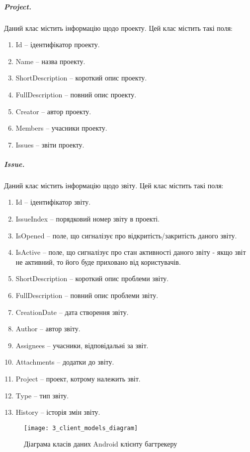 \documentclass[../main.tex]{subfiles}
\begin{document}
		\subparagraph{Project.}
			Даний клас містить інформацію щодо проекту. Цей клас містить такі поля:
			\begin{enumerate}
				\item Id -- ідентифікатор проекту.
				\item Name -- назва проекту.
				\item ShortDescription -- короткий опис проекту.
				\item FullDescription -- повний опис проекту.
				\item Creator -- автор проекту.
				\item Members -- учасники проекту.
				\item Issues -- звіти проекту.
			\end{enumerate}

		\subparagraph{Issue.}
			Даний клас містить інформацію щодо звіту. Цей клас містить такі поля:
			\begin{enumerate}
				\item Id -- ідентифікатор звіту.
				\item IssueIndex -- порядковий номер звіту в проекті.
				\item IsOpened -- поле, що сигналізує про відкритість/закритість даного звіту.
				\item IsActive -- поле, що сигналізує про стан активності даного звіту - якщо звіт не активний, то його буде приховано від користувачів.
				\item ShortDescription -- короткий опис проблеми звіту.
				\item FullDescription -- повний опис проблеми звіту.
				\item CreationDate -- дата створення звіту.
				\item Author -- автор звіту.
				\item Assignees -- учасники, відповідальні за звіт.
				\item Attachments -- додатки до звіту.
				\item Project -- проект, котрому належить звіт.
				\item Type -- тип звіту.
				\item History -- історія змін звіту.
			\end{enumerate}

		\begin{figure}[H]
			\centering
			\texttt{[image: 3\_client\_models\_diagram]}
			\caption{Діаграма класів даних Android клієнту багтрекеру}
			\label{client_models}
		\end{figure}
		
\end{document}
